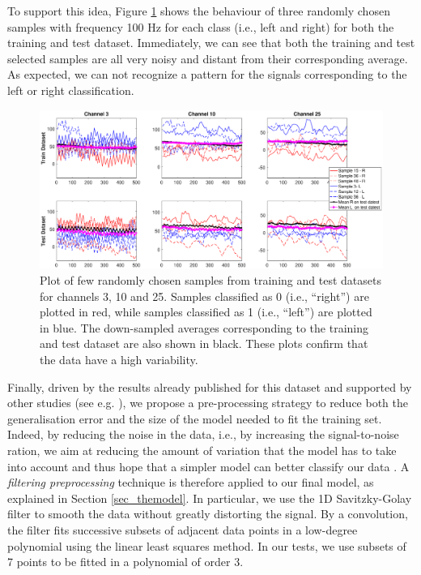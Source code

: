 \documentclass{article}
\begin{document}
 To support this idea, Figure \ref{fig_fewsamples_vs_mean_downsampled}  shows the behaviour of three randomly chosen samples with frequency 100 Hz for each class (i.e., left and right) for both the training and test dataset. 
 Immediately, we can see that both the training and test selected samples are all very noisy and distant from their corresponding average.
 As expected, we can not recognize a pattern for the signals corresponding to the left or right classification. 
  \begin{figure}[t]
 \begin{center}
  \includegraphics[width=1\textwidth]{fig/fig5new_fewsamples_mean_downsampled} 
  \caption{Plot of few randomly chosen samples from training and test datasets for channels 3, 10 and 25.
  Samples classified as 0 (i.e., ``right'') are plotted in red, while   samples classified as 1 (i.e., ``left'') are plotted in blue.
  The down-sampled averages corresponding to the training and test dataset are also shown in black.
   These plots confirm that the data have a high variability. 
  \label{fig_fewsamples_vs_mean_downsampled}}
  \end{center}
  \end{figure}

Finally, driven by the results already published for this dataset \cite{bci_ii} and supported by other studies (see e.g. \cite{schirrmeister2017deep}), we propose a pre-processing strategy to reduce both the generalisation error and the size of the model needed to fit the training set.
Indeed, by reducing the noise in the data, i.e., by increasing the signal-to-noise ration, we aim at reducing the amount of variation that the model has to take into account and thus hope that a simpler model can better classify our data  \cite{goodfellow2016deep} . 
A \emph{filtering preprocessing} technique is therefore applied to our  final model, as explained in Section \ref{sec_themodel}.
In particular, we use the 1D Savitzky-Golay filter \cite{savgol} to smooth the data without greatly distorting the signal. 
By a convolution, the filter fits successive subsets of adjacent data points in a low-degree polynomial using the linear least squares method. 
In our tests, we use subsets of 7 points to be fitted in a polynomial of order 3. 
\end{document}
